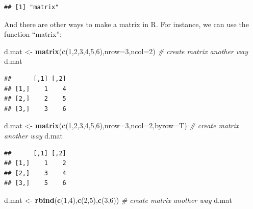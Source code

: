 \documentclass[]{article}
\newenvironment{Shaded}{\begin{snugshade}}{\end{snugshade}}
\newcommand{\KeywordTok}[1]{\textcolor[rgb]{0.13,0.29,0.53}{\textbf{#1}}}
\newcommand{\DataTypeTok}[1]{\textcolor[rgb]{0.13,0.29,0.53}{#1}}
\newcommand{\DecValTok}[1]{\textcolor[rgb]{0.00,0.00,0.81}{#1}}
\newcommand{\StringTok}[1]{\textcolor[rgb]{0.31,0.60,0.02}{#1}}
\newcommand{\CommentTok}[1]{\textcolor[rgb]{0.56,0.35,0.01}{\textit{#1}}}
\newcommand{\NormalTok}[1]{#1}
\begin{document}
\begin{verbatim}
## [1] "matrix"
\end{verbatim}

And there are other ways to make a matrix in R. For instance, we can use
the function ``matrix'':

\begin{Shaded}
\begin{Highlighting}[]
\NormalTok{d.mat <-}\StringTok{ }\KeywordTok{matrix}\NormalTok{(}\KeywordTok{c}\NormalTok{(}\DecValTok{1}\NormalTok{,}\DecValTok{2}\NormalTok{,}\DecValTok{3}\NormalTok{,}\DecValTok{4}\NormalTok{,}\DecValTok{5}\NormalTok{,}\DecValTok{6}\NormalTok{),}\DataTypeTok{nrow=}\DecValTok{3}\NormalTok{,}\DataTypeTok{ncol=}\DecValTok{2}\NormalTok{)        }\CommentTok{# create matrix another way}
\NormalTok{d.mat}
\end{Highlighting}
\end{Shaded}

\begin{verbatim}
##      [,1] [,2]
## [1,]    1    4
## [2,]    2    5
## [3,]    3    6
\end{verbatim}

\begin{Shaded}
\begin{Highlighting}[]
\NormalTok{d.mat <-}\StringTok{ }\KeywordTok{matrix}\NormalTok{(}\KeywordTok{c}\NormalTok{(}\DecValTok{1}\NormalTok{,}\DecValTok{2}\NormalTok{,}\DecValTok{3}\NormalTok{,}\DecValTok{4}\NormalTok{,}\DecValTok{5}\NormalTok{,}\DecValTok{6}\NormalTok{),}\DataTypeTok{nrow=}\DecValTok{3}\NormalTok{,}\DataTypeTok{ncol=}\DecValTok{2}\NormalTok{,}\DataTypeTok{byrow=}\NormalTok{T)        }\CommentTok{# create matrix another way}
\NormalTok{d.mat}
\end{Highlighting}
\end{Shaded}

\begin{verbatim}
##      [,1] [,2]
## [1,]    1    2
## [2,]    3    4
## [3,]    5    6
\end{verbatim}

\begin{Shaded}
\begin{Highlighting}[]
\NormalTok{d.mat <-}\StringTok{ }\KeywordTok{rbind}\NormalTok{(}\KeywordTok{c}\NormalTok{(}\DecValTok{1}\NormalTok{,}\DecValTok{4}\NormalTok{),}\KeywordTok{c}\NormalTok{(}\DecValTok{2}\NormalTok{,}\DecValTok{5}\NormalTok{),}\KeywordTok{c}\NormalTok{(}\DecValTok{3}\NormalTok{,}\DecValTok{6}\NormalTok{))        }\CommentTok{# create matrix another way}
\NormalTok{d.mat}
\end{Highlighting}
\end{Shaded}
\end{document}
